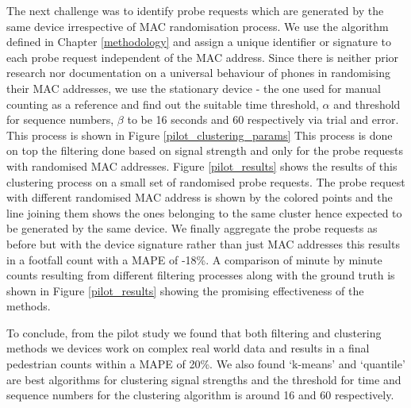 The next challenge was to identify probe requests which are generated by the
same device irrespective of MAC randomisation process.  We use the algorithm
defined in Chapter \ref{methodology} and assign a unique identifier or signature
to each probe request independent of the MAC address.  Since there is neither
prior research nor documentation on a universal behaviour of phones in
randomising their MAC addresses, we use the stationary device - the one used for
manual counting as a reference and find out the suitable time threshold,
$\alpha$ and threshold for sequence numbers, $\beta$ to be 16 seconds and 60
respectively via trial and error. This process is shown in Figure
\ref{pilot_clustering_params} This process is done on top the filtering done
based on signal strength and only for the probe requests with randomised MAC
addresses.  Figure \ref{pilot_results} shows the results of this clustering
process on a small set of randomised probe requests.  The probe request with
different randomised MAC address is shown by the colored points and the line
joining them shows the ones belonging to the same cluster hence expected to be
generated by the same device.  We finally aggregate the probe requests as before
but with the device signature rather than just MAC addresses this results in a
footfall count with a MAPE of -18\%.  A comparison of minute by minute counts
resulting from different filtering processes along with the ground truth is
shown in Figure \ref{pilot_results} showing the promising effectiveness of the
methods.

To conclude, from the pilot study we found that both filtering and clustering
methods we devices work on complex real world data and results in a final
pedestrian counts within a MAPE of 20\%. We also found `k-means' and `quantile'
are best algorithms for clustering signal strengths and the threshold for time
and sequence numbers for the clustering algorithm is around 16 and 60
respectively.

